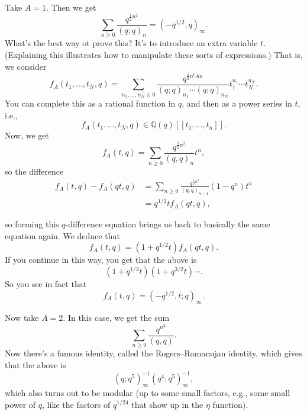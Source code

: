 \documentclass[reqno]{amsart} 
\begin{document}
\begin{example}
  Take $A = 1$.  Then we get
  \begin{equation*}
    \sum_{n \geq 0}
    \frac{q^{\tfrac{1}{2} n^2}}{(q ; q)_n}
    =(- q^{1/2} , q)_\infty.
  \end{equation*}
  What's the best way ot prove this?  It's to introduce an extra variable $t$.  (Explaining this illustrates how to manipulate these sorts of expressions.)  That is, we consider
  \begin{equation*}
    f_A(t_1, \dotsc, t_N, q) = \sum_{n_1 , \dotsc, n_N \geq 0}
    \frac{q^{\tfrac{1}{2} n^t A n}}{(q ; q)_{n_1} \dotsb(q ; q)_{n_N}}
    t_1^{n_1} \dotsb t_N^{n_N}.
  \end{equation*}
  You can complete this as a rational function in $q$, and then as a power series in $t$, i.e.,
  \begin{equation*}
    f_A(t_1, \dotsc, t_N, q) \in \mathbb{Q}(q)[[t_1, \dotsc, t_n]].
  \end{equation*}
  Now, we get
  \begin{equation*}
    f_A(t, q) = \sum_{n \geq 0}  \frac{q^{\tfrac{1}{2} n^2}}{(q, q)_n} t^n,
  \end{equation*}
  so the difference
  \begin{align*}
    f_A(t, q) - f_A(q t, q) &= \sum_{n \geq 0}
                              \frac{q^{\tfrac{1}{2} n^2}}{(q, q)_{n-1}}
                              (1 - q^n) t^n \\
                            &=
                              q^{1/2} t f_A(q t, q),
  \end{align*}

  so forming this $q$-difference equation brings us back to basically the same equation again.  We deduce that
  \begin{equation*}
    f_A(t, q) =(1 + q^{1/2} t) f_A(q t, q).
  \end{equation*}
  If you continue in this way, you get that the above is
  \begin{equation*}
    (1 + q^{1/2} t)(1 + q^{3/2} t) \dotsb.
  \end{equation*}
  So you see in fact that
  \begin{equation*}
    f_A(t, q) =(- q^{1/2}, t ; q)_\infty.
  \end{equation*}
\end{example}
\begin{example}\label{example:cnpplyhw33}
  Now take $A = 2$.  In this case, we get the sum
  \begin{equation*}
    \sum_{n \geq 0}
    \frac{q^{n^2}}{(q, q)}.
  \end{equation*}
  Now there's a famous identity, called the Rogers--Ramanujan identity, which gives that the above is
  \begin{equation*}
    (q; q^5)^{-1}_\infty(q^4; q^5 )^{-1}_\infty,
  \end{equation*}
  which also turns out to be modular (up to some small factors, e.g., some small power of $q$, like the factors of $q^{1/24}$ that show up in the $\eta$ function).
\end{example}
\end{document}
